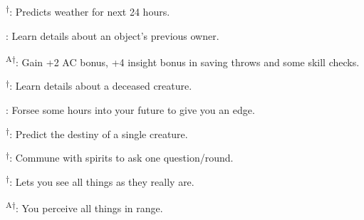 \begin{enumerate*}
      \textsuperscript{$\dagger$}: Predicts weather for next 24 hours.

\item {}: Learn details about an object's previous owner.

      \textsuperscript{A$\dagger$}: Gain +2 AC bonus, +4 insight bonus in saving throws and some skill checks.

\item {}\textsuperscript{$\dagger$}: Learn details about a deceased creature.

      : Forsee some hours into your future to give you an edge.

\item {}\textsuperscript{$\dagger$}: Predict the destiny of a single creature.

\item {}\textsuperscript{$\dagger$}: Commune with spirits to ask one question/round.

      \textsuperscript{$\dagger$}: Lets you see all things as they really are.

\item {}\textsuperscript{A$\dagger$}: You perceive all things in range.
\end{enumerate*}



